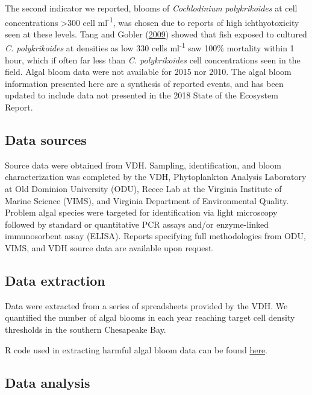 \documentclass[
]{book}
\begin{document}
The second indicator we reported, blooms of \emph{Cochlodinium polykrikoides} at cell concentrations \textgreater{}300 cell ml\textsuperscript{-1}, was chosen due to reports of high ichthyotoxicity seen at these levels. Tang and Gobler (\protect\hyperlink{ref-Tang2009}{2009}) showed that fish exposed to cultured \emph{C. polykrikoides} at densities as low 330 cells ml\textsuperscript{-1} saw 100\% mortality within 1 hour, which if often far less than \emph{C. polykrikoides} cell concentrations seen in the field. Algal bloom data were not available for 2015 nor 2010. The algal bloom information presented here are a synthesis of reported events, and has been updated to include data not presented in the 2018 State of the Ecosystem Report.

\hypertarget{data-sources-22}{%
\subsection{Data sources}\label{data-sources-22}}

Source data were obtained from VDH. Sampling, identification, and bloom characterization was completed by the VDH, Phytoplankton Analysis Laboratory at Old Dominion University (ODU), Reece Lab at the Virginia Institute of Marine Science (VIMS), and Virginia Department of Environmental Quality. Problem algal species were targeted for identification via light microscopy followed by standard or quantitative PCR assays and/or enzyme-linked immunosorbent assay (ELISA). Reports specifying full methodologies from ODU, VIMS, and VDH source data are available upon request.

\hypertarget{data-extraction-20}{%
\subsection{Data extraction}\label{data-extraction-20}}

Data were extracted from a series of spreadsheets provided by the VDH. We quantified the number of algal blooms in each year reaching target cell density thresholds in the southern Chesapeake Bay.



R code used in extracting harmful algal bloom data can be found \href{https://github.com/NOAA-EDAB/tech-doc/tree/master/R/stored_scripts/mab_hab_extraction.R}{here}.

\hypertarget{data-analysis-20}{%
\subsection{Data analysis}\label{data-analysis-20}}
\end{document}
